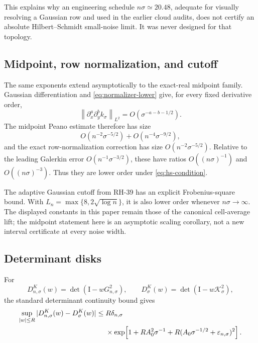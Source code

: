 \documentclass[11pt]{article}
\theoremstyle{definition}
\theoremstyle{remark}
\newcommand{\Id}{\mathrm I}
\newcommand{\cK}{\mathcal K}
\newcommand{\norm}[1]{\left\lVert #1\right\rVert}
\newcommand{\detF}{\operatorname{det}}
\begin{document}
This explains why an engineering schedule $n\sigma\simeq20.48$, adequate
for visually resolving a Gaussian row and used in the earlier cloud audits,
does not certify an absolute Hilbert--Schmidt small-noise limit.  It was never
designed for that topology.

\subsection{Midpoint, row normalization, and cutoff}

The same exponents extend asymptotically to the exact-real midpoint family.
Gaussian differentiation and \eqref{eq:normalizer-lower} give, for every
fixed derivative order,
\begin{equation}
 \norm{\partial_x^a\partial_y^b k_\sigma}_{L^2}
 =O\!\left(\sigma^{-a-b-1/2}\right).
 \label{eq:all-derivative-scaling}
\end{equation}
The midpoint Peano estimate therefore has size
\begin{equation}
 O(n^{-2}\sigma^{-5/2})
 +O(n^{-4}\sigma^{-9/2}),
 \label{eq:midpoint-scaling}
\end{equation}
and the exact row-normalization correction has size
$O(n^{-2}\sigma^{-5/2})$.  Relative to the leading Galerkin error
$O(n^{-1}\sigma^{-3/2})$, these have ratios
$O((n\sigma)^{-1})$ and $O((n\sigma)^{-3})$.  Thus they are lower order
under \eqref{eq:hs-condition}.

The adaptive Gaussian cutoff from RH-39 has an explicit Frobenius-square
bound.  With $L_n=\max\{8,2\sqrt{\log n}\}$, it is also lower order whenever
$n\sigma\to\infty$.  The displayed constants in this paper remain those of
the canonical cell-average lift; the midpoint statement here is an
asymptotic scaling corollary, not a new interval certificate at every
noise width.

\subsection{Determinant disks}

For
\[
 D_{n,\sigma}^{K}(w)=\detF(\Id-wG_{n,\sigma}^2),
 \qquad
 D_{\sigma}^{K}(w)=\detF(\Id-w\cK_\sigma^2),
\]
the standard determinant continuity bound gives
\begin{align}
 \sup_{|w|\le R}|D_{n,\sigma}^{K}(w)-D_\sigma^K(w)|
 \le{}&R\delta_{n,\sigma}
 \notag\\
 &\times
 \exp\!\left[
  1+RA_0^2\sigma^{-1}
  +R(A_0\sigma^{-1/2}+\varepsilon_{n,\sigma})^2
 \right].
 \label{eq:determinant-continuity}
\end{align}
\end{document}
